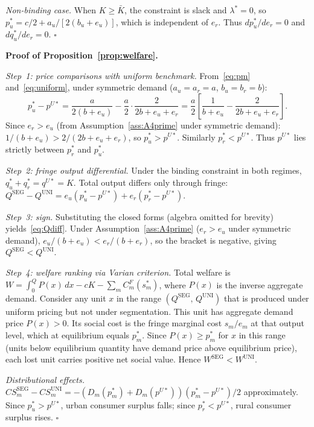 \documentclass[12pt]{article}
\theoremstyle{plain}
\theoremstyle{definition}
\theoremstyle{remark}
\begin{document}
\emph{Non-binding case.}  When $K \geq \bar{K}$, the constraint is slack and
$\lambda^* = 0$, so $p_u^* = c/2 + a_u/[2(b_u + e_u)]$, which is independent
of $e_r$.  Thus $dp_u^*/de_r = 0$ and $dq_u^*/de_r = 0$. \hfill$\square$

\bigskip

\textbf{Proof of Proposition~\ref{prop:welfare}.}

\emph{Step~1: price comparisons with uniform benchmark.}  From~\eqref{eq:pm}
and~\eqref{eq:uniform}, under symmetric demand ($a_u = a_r = a$, $b_u = b_r = b$):
\begin{equation*}
  p_u^* - p^{U*} = \frac{a}{2(b+e_u)} - \frac{a}{2} \cdot \frac{2}{2b + e_u + e_r}
  = \frac{a}{2}\left[\frac{1}{b+e_u} - \frac{2}{2b+e_u+e_r}\right].
\end{equation*}
Since $e_r > e_u$ (from Assumption~\ref{ass:A4prime} under symmetric demand):
$1/(b+e_u) > 2/(2b+e_u+e_r)$, so $p_u^* > p^{U*}$.  Similarly
$p_r^* < p^{U*}$.  Thus $p^{U*}$ lies strictly between $p_r^*$ and $p_u^*$.

\emph{Step~2: fringe output differential.}  Under the binding constraint in
both regimes, $q_u^* + q_r^* = q^{U*} = K$.  Total output differs only through
fringe: $Q^{\mathrm{SEG}} - Q^{\mathrm{UNI}} = e_u(p_u^* - p^{U*}) + e_r(p_r^* - p^{U*})$.

\emph{Step~3: sign.}  Substituting the closed forms (algebra omitted for
brevity) yields~\eqref{eq:Qdiff}.  Under Assumption~\ref{ass:A4prime} ($e_r > e_u$
under symmetric demand), $e_u/(b+e_u) < e_r/(b+e_r)$, so the bracket is negative,
giving $Q^{\mathrm{SEG}} < Q^{\mathrm{UNI}}$.

\emph{Step~4: welfare ranking via Varian criterion.}  Total welfare is
$W = \int_0^Q P(x)\,dx - cK - \sum_m C_m^F(s_m^*)$,
where $P(x)$ is the inverse aggregate demand.  Consider any unit $x$ in the range
$(Q^{\mathrm{SEG}},\, Q^{\mathrm{UNI}})$ that is produced under uniform pricing but
not under segmentation.  This unit has aggregate demand price $P(x) > 0$.
Its social cost is the fringe marginal cost $s_m/e_m$ at that output level, which
at equilibrium equals $p_m^*$.  Since $P(x) \geq p_m^*$ for $x$ in this range
(units below equilibrium quantity have demand price above equilibrium price), each
lost unit carries positive net social value.  Hence $W^{\mathrm{SEG}} < W^{\mathrm{UNI}}$.

\emph{Distributional effects.}  $CS_m^{\mathrm{SEG}} - CS_m^{\mathrm{UNI}}
= -(D_m(p_m^*) + D_m(p^{U*}))(p_m^* - p^{U*})/2$ approximately.
Since $p_u^* > p^{U*}$, urban consumer surplus falls; since $p_r^* < p^{U*}$,
rural consumer surplus rises. \hfill$\square$
\end{document}
